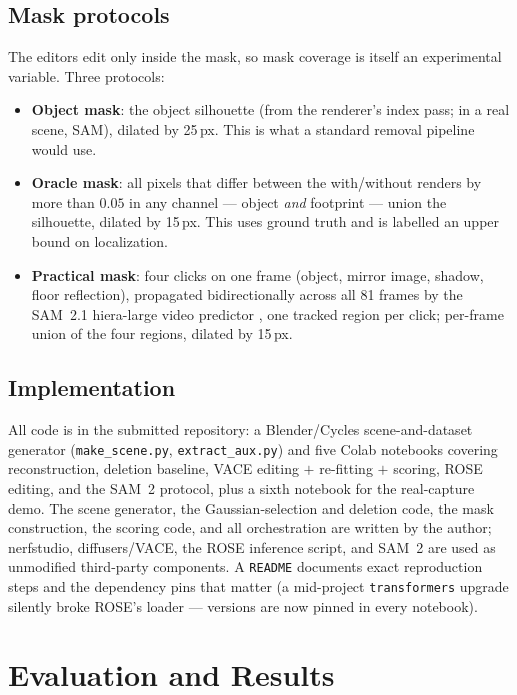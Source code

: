 \documentclass[11pt]{article}
\begin{document}
\subsection{Mask protocols}
\label{sec:masks}
The editors edit only inside the mask, so mask coverage is itself an experimental variable. Three protocols:
\begin{itemize}
  \item \textbf{Object mask}: the object silhouette (from the renderer's index pass; in a real scene, SAM), dilated by 25\,px. This is what a standard removal pipeline would use.
  \item \textbf{Oracle mask}: all pixels that differ between the with/without renders by more than $0.05$ in any channel --- object \emph{and} footprint --- union the silhouette, dilated by 15\,px. This uses ground truth and is labelled an upper bound on localization.
  \item \textbf{Practical mask}: four clicks on one frame (object, mirror image, shadow, floor reflection), propagated bidirectionally across all 81 frames by the SAM~2.1 hiera-large video predictor \cite{sam2}, one tracked region per click; per-frame union of the four regions, dilated by 15\,px.
\end{itemize}

\subsection{Implementation}
\label{sec:implementation}
All code is in the submitted repository: a Blender/Cycles scene-and-dataset generator (\texttt{make\_scene.py}, \texttt{extract\_aux.py}) and five Colab notebooks covering reconstruction, deletion baseline, VACE editing $+$ re-fitting $+$ scoring, ROSE editing, and the SAM~2 protocol, plus a sixth notebook for the real-capture demo. The scene generator, the Gaussian-selection and deletion code, the mask construction, the scoring code, and all orchestration are written by the author; nerfstudio, diffusers/VACE, the ROSE inference script, and SAM~2 are used as unmodified third-party components. A \texttt{README} documents exact reproduction steps and the dependency pins that matter (a mid-project \texttt{transformers} upgrade silently broke ROSE's loader --- versions are now pinned in every notebook).

\section{Evaluation and Results}
\label{sec:eval}
\end{document}
